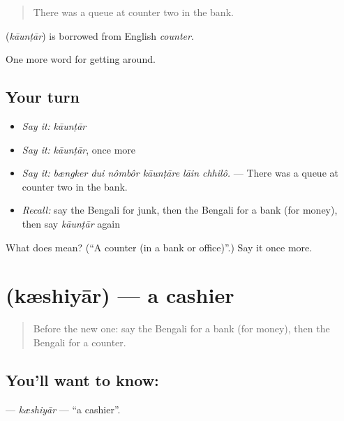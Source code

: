 \begin{quote}
There was a queue at counter two in the bank.
\end{quote}

\begin{cousinweb}
\textbf{} (\emph{kāunṭār}) is borrowed from English \emph{counter}.
\end{cousinweb}

\begin{grammarlens}[title={What you've built}]
One more word for getting around.
\end{grammarlens}

\subsection*{Your turn}
\begin{itemize}
\raggedright
  \item \emph{Say it:} \emph{kāunṭār}
  \item \emph{Say it:} \emph{kāunṭār}, once more
  \item \emph{Say it:} \emph{bængker dui nômbôr kāunṭāre lāin chhilô.} — There was a queue at counter two in the bank.
  \item \emph{Recall:} say the Bengali for junk, then the Bengali for a bank (for money), then say \emph{kāunṭār} again
\end{itemize}

\begin{tcolorbox}[breakable,colback=teal!4,colframe=teal!35!black,title={Before you move on}]
What does  mean? (\textquotedblleft{}A counter (in a bank or office)\textquotedblright{}.) Say it once more.
\end{tcolorbox}
\section[\texorpdfstring{\bn{ক্যাশিয়ার} (kæshiyār)}{ক্যাশিয়ার (kæshiyār)}]{ (kæshiyār) — a cashier}

\label{lesson:BN-C414-keshiyar}



\begin{quote}
Before the new one: say the Bengali for a bank (for money), then the Bengali for a counter.
\end{quote}

\subsection*{You'll want to know: }
\textbf{} — \emph{kæshiyār} — \textquotedblleft{}a cashier\textquotedblright{}.


